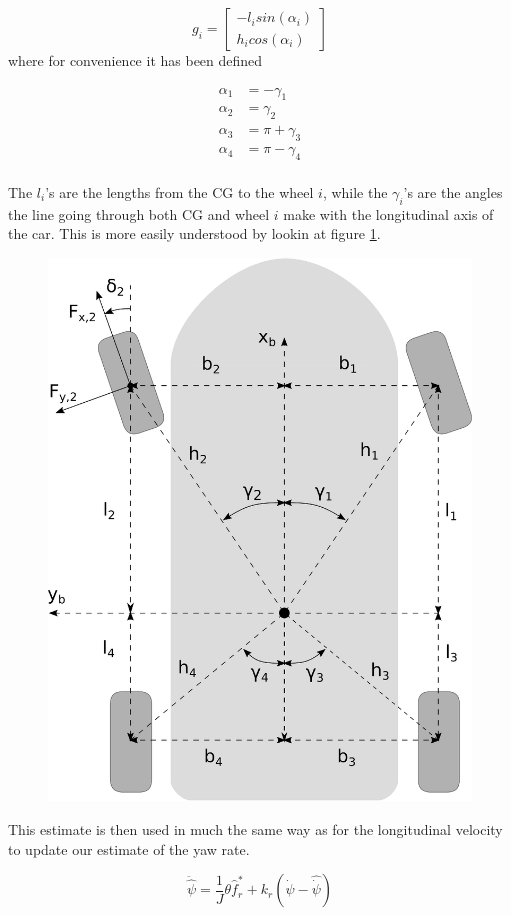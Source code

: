 \begin{equation}
    g_i = \begin{bmatrix} -l_i sin(\alpha_i) \\ h_i cos(\alpha_i)
    \end{bmatrix}
\end{equation}
where for convenience it has been defined

\begin{align}
    \alpha_1 & = -\gamma_1 \\
    \alpha_2 & = \gamma_2 \\
    \alpha_3 & = \pi + \gamma_3 \\
    \alpha_4 & = \pi -\gamma_4 \\
\end{align}

The $l_i$'s are the lengths from the CG to the wheel $i$, while the $\gamma_i$'s are the angles the line going through both CG and wheel $i$ make with the longitudinal axis of the car. This is more easily understood by lookin at figure \ref{Fig:WheelTorques}. \\

\begin{figure}
    \centering
    \includegraphics[width=0.5\linewidth]{0_Images/3_Theory/TorqueCalculations.eps}
    \label{Fig:WheelTorques}
\end{figure}

This estimate is then used in much the same way as for the longitudinal velocity to update our estimate of the yaw rate.

\begin{equation}
    \ddot{\hat{\psi}} = \frac{1}{J}\theta \hat{f}_r^* + k_r(\dot{\psi}-\hat{\dot{\psi}})
\end{equation}

